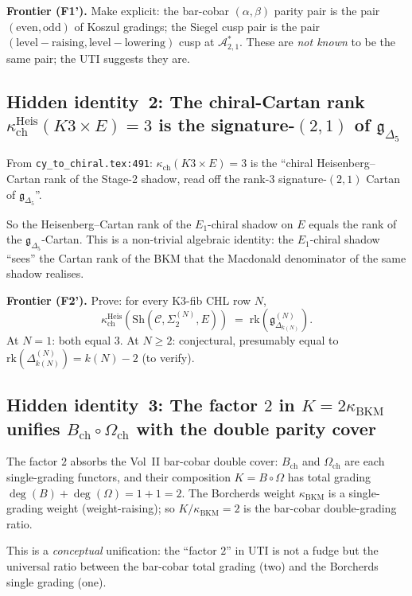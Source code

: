 \documentclass[11pt]{amsart}
\theoremstyle{definition}
\theoremstyle{remark}
\newcommand{\kch}{\kappa_{\mathrm{ch}}}
\newcommand{\kBKM}{\kappa_{\mathrm{BKM}}}
\begin{document}
\textbf{Frontier (F1').} Make explicit: the bar-cobar $(\alpha, \beta)$ parity pair is the pair
$(\mathrm{even}, \mathrm{odd})$ of Koszul gradings; the Siegel cusp pair is the pair
$(\mathrm{level-raising}, \mathrm{level-lowering})$ cusp at $\mathcal{A}_{2,1}^*$. These are
\emph{not known} to be the same pair; the UTI suggests they are.

\subsection{Hidden identity~2: The chiral-Cartan rank $\kch^{\mathrm{Heis}}(K3 \times E) = 3$ is the signature-$(2,1)$ of $\mathfrak{g}_{\Delta_5}$}

From \texttt{cy\_to\_chiral.tex:491}: $\kch(K3 \times E) = 3$ is the ``chiral Heisenberg--Cartan
rank of the Stage-2 shadow, read off the rank-$3$ signature-$(2,1)$ Cartan of
$\mathfrak{g}_{\Delta_5}$''.

So the Heisenberg--Cartan rank of the $E_1$-chiral shadow on $E$ equals the rank of the
$\mathfrak{g}_{\Delta_5}$-Cartan. This is a non-trivial algebraic identity: the $E_1$-chiral
shadow ``sees'' the Cartan rank of the BKM that the Macdonald denominator of the same shadow
realises.

\textbf{Frontier (F2').} Prove: for every K3-fib CHL row $N$,
\[
\kch^{\mathrm{Heis}}(\mathrm{Sh}(\mathcal{C}, \Sigma_2^{(N)}, E)) \;=\; \mathrm{rk}(\mathfrak{g}_{\Delta_{k(N)}}^{(N)}).
\]
At $N = 1$: both equal $3$. At $N \geq 2$: conjectural, presumably equal to
$\mathrm{rk}(\Delta_{k(N)}^{(N)}) = k(N) - 2$ (to verify).

\subsection{Hidden identity~3: The factor $2$ in $K = 2\kBKM$ unifies $B_{\mathrm{ch}}\circ\Omega_{\mathrm{ch}}$ with the double parity cover}

The factor $2$ absorbs the Vol~II bar-cobar double cover: $B_{\mathrm{ch}}$ and $\Omega_{\mathrm{ch}}$
are each single-grading functors, and their composition $K = B \circ \Omega$ has total grading
$\deg(B) + \deg(\Omega) = 1 + 1 = 2$. The Borcherds weight $\kBKM$ is a single-grading weight
(weight-raising); so $K / \kBKM = 2$ is the bar-cobar double-grading ratio.

This is a \emph{conceptual} unification: the ``factor $2$'' in UTI is not a fudge but the
universal ratio between the bar-cobar total grading (two) and the Borcherds single grading (one).
\end{document}
